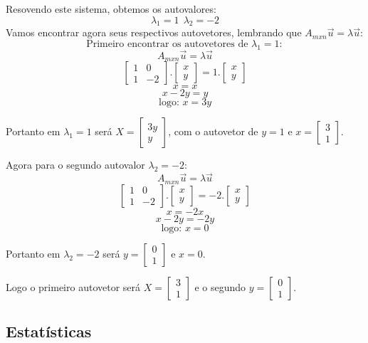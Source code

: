 \documentclass[
]{book}
\begin{document}
Resovendo este sistema, obtemos os autovalores:
\[\lambda_1=1 \ \ \lambda_2=-2\]
Vamos encontrar agora seus respectivos autovetores, lembrando que \(A_{mxn}\vec{u}=\lambda \vec{u}\):
\[ \mbox{Primeiro encontrar os autovetores de }\lambda_1=1:\]
\[A_{mxn}\vec{u}=\lambda \vec{u}\]
\[\begin{bmatrix}
1 &0 \\ 
1 &-2 
\end{bmatrix}. \begin{bmatrix}
x \\ 
y  
\end{bmatrix}=1.\begin{bmatrix}
x \\ 
y  
\end{bmatrix} \]
\[x=x \]
\[x-2y=y \]
\[\mbox{logo: } x=3y\]

Portanto em \(\lambda_1=1\) será \(X=\begin{bmatrix}3y\\y\end{bmatrix}\), com o autovetor de \(y=1\) e \(x=\begin{bmatrix}3\\1\end{bmatrix}\).

Agora para o segundo autovalor \(\lambda_2=-2\):
\[A_{mxn}\vec{u}=\lambda \vec{u} \]
\[\begin{bmatrix}
1 &0 \\ 
1 &-2 
\end{bmatrix}. \begin{bmatrix}
x \\ 
y  
\end{bmatrix}=-2.\begin{bmatrix}
x \\ 
y  
\end{bmatrix} \]
\[x=-2x\]
\[x-2y=-2y \]
\[ \mbox{logo: } x=0\]

Portanto em \(\lambda_2=-2\) será \(y=\begin{bmatrix}0\\1\end{bmatrix}\) e \(x=0\).

Logo o primeiro autovetor será \(X=\begin{bmatrix}3\\1\end{bmatrix}\) e o segundo \(y=\begin{bmatrix}0\\1\end{bmatrix}\).

\hypertarget{estatuxedsticas}{%
\subsection{Estatísticas}\label{estatuxedsticas}}
\end{document}
